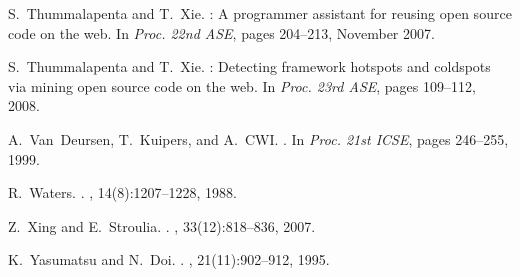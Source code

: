 \documentclass{sig-alternate}
\begin{document}
\begin{scriptsize}
\begin{thebibliography}{10}
S.~Thummalapenta and T.~Xie.
: A programmer assistant for reusing open source code on
  the web.
\newblock In {\em Proc. 22nd ASE}, pages 204--213, November 2007.

S.~Thummalapenta and T.~Xie.
: Detecting framework hotspots and coldspots via mining open
  source code on the web.
\newblock In {\em Proc. 23rd ASE}, pages 109--112, 2008.

A.~Van~Deursen, T.~Kuipers, and A.~CWI.
.
\newblock In {\em Proc. 21st ICSE}, pages 246--255, 1999.

R.~Waters.
.
, 14(8):1207--1228,
  1988.

Z.~Xing and E.~Stroulia.
.
, 33(12):818--836,
  2007.

K.~Yasumatsu and N.~Doi.
.
, 21(11):902--912,
  1995.

\end{thebibliography}
\end{scriptsize}

%
%

\end{document}
